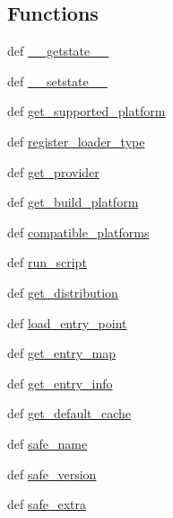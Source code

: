 \subsection*{Functions}
\begin{DoxyCompactItemize}
\item 
def \hyperlink{namespacepkg__resources_ad5b6b4e0dd166154f7c4251494ab4d27}{\+\_\+\+\_\+getstate\+\_\+\+\_\+}
\item 
def \hyperlink{namespacepkg__resources_acb7047bf99809d3d7d4ccff1f38f9f38}{\+\_\+\+\_\+setstate\+\_\+\+\_\+}
\item 
def \hyperlink{namespacepkg__resources_afb9040058597e847ae8e5d78c7aee50a}{get\+\_\+supported\+\_\+platform}
\item 
def \hyperlink{namespacepkg__resources_a13375dd01376f7c70f138218780cf8ed}{register\+\_\+loader\+\_\+type}
\item 
def \hyperlink{namespacepkg__resources_a2b343404578fee1ffb585649047345d8}{get\+\_\+provider}
\item 
def \hyperlink{namespacepkg__resources_afeca82ef5e1a8f269c93392a0ffd64c1}{get\+\_\+build\+\_\+platform}
\item 
def \hyperlink{namespacepkg__resources_a3e17e24daba731096c4cf330a32849e8}{compatible\+\_\+platforms}
\item 
def \hyperlink{namespacepkg__resources_a4d7a2d6ad97d8f7299771d7eefa7266a}{run\+\_\+script}
\item 
def \hyperlink{namespacepkg__resources_a85023bc2d7aefa8489507e5edae886f7}{get\+\_\+distribution}
\item 
def \hyperlink{namespacepkg__resources_ad940cfd7a03af04ca7ab9312ffd6a9e6}{load\+\_\+entry\+\_\+point}
\item 
def \hyperlink{namespacepkg__resources_a9870f154e4e4b32a73e8e1f530249ed6}{get\+\_\+entry\+\_\+map}
\item 
def \hyperlink{namespacepkg__resources_adc8b186aad496ae663c3d482f5026d57}{get\+\_\+entry\+\_\+info}
\item 
def \hyperlink{namespacepkg__resources_a2d6ccbe097080724ee42ecf54fe366a9}{get\+\_\+default\+\_\+cache}
\item 
def \hyperlink{namespacepkg__resources_a7427741ca0ef392272d9fa0b7234d7e1}{safe\+\_\+name}
\item 
def \hyperlink{namespacepkg__resources_a602d85a90d711f9ecfe81cf5ffee4ff0}{safe\+\_\+version}
\item 
def \hyperlink{namespacepkg__resources_ad882b736b30b1d053ad25259be3cb29b}{safe\+\_\+extra}
\item 

\end{DoxyCompactItemize}
